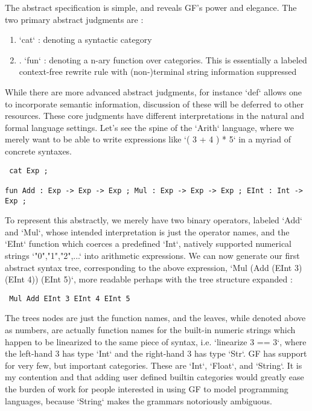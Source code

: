 The abstract specification is simple, and reveals GF's power and elegance. The
two primary abstract judgments are :

\begin{enumerate}
\item `cat` : denoting a syntactic category
\item. `fun` : denoting a n-ary function over categories. This is essentially a
labeled context-free rewrite rule with (non-)terminal string information
suppressed
\end{enumerate}

While there are more advanced abstract judgments, for instance `def` allows one
to incorporate semantic information, discussion of these will be deferred to
other resources. These core judgments have different interpretations in the
natural and formal language settings. Let's see the spine of the `Arith`
language, where we merely want to be able to write expressions like `( 3 + 4 ) *
5` in a myriad of concrete syntaxes.

\begin{verbatim} cat Exp ;

fun Add : Exp -> Exp -> Exp ; Mul : Exp -> Exp -> Exp ; EInt : Int -> Exp ;
\end{verbatim}

To represent this abstractly, we merely have two binary operators, labeled `Add`
and `Mul`, whose intended interpretation is just the operator names, and the
`EInt` function which coerces a predefined `Int`, natively supported numerical
strings `"0","1","2",...` into arithmetic expressions. We can now generate our
first abstract syntax tree, corresponding to the above expression, `Mul (Add
(EInt 3) (EInt 4)) (EInt 5)`, more readable perhaps with the tree structure
expanded :

\begin{verbatim} Mul Add EInt 3 EInt 4 EInt 5
\end{verbatim}

The trees nodes are just the function names, and the leaves, while denoted above
as numbers, are actually function names for the built-in numeric strings which
happen to be linearized to the same piece of syntax, i.e. `linearize 3 == 3`,
where the left-hand 3 has type `Int` and the right-hand 3 has type `Str`. GF has
support for very few, but important categories. These are `Int`, `Float`, and
`String`. It is my contention and that adding user defined builtin categories
would greatly ease the burden of work for people interested in using GF to model
programming languages, because `String` makes the grammars notoriously
ambiguous.

